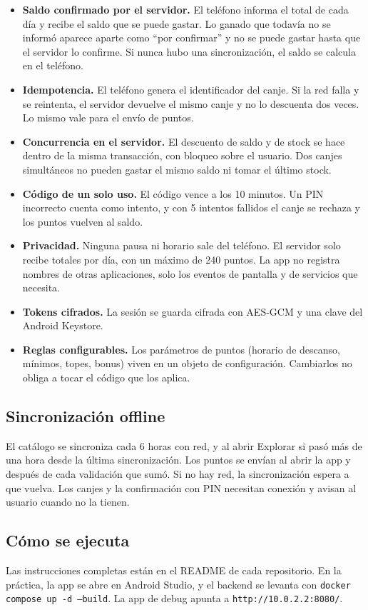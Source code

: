 \begin{itemize}
\item \textbf{Saldo confirmado por el servidor.} El teléfono informa el total de cada día y recibe el
saldo que se puede gastar. Lo ganado que todavía no se informó aparece aparte como ``por confirmar''
y no se puede gastar hasta que el servidor lo confirme. Si nunca hubo una sincronización, el saldo se
calcula en el teléfono.
\item \textbf{Idempotencia.} El teléfono genera el identificador del canje. Si la red falla y se reintenta,
el servidor devuelve el mismo canje y no lo descuenta dos veces. Lo mismo vale para el envío de puntos.
\item \textbf{Concurrencia en el servidor.} El descuento de saldo y de stock se hace dentro de la misma
transacción, con bloqueo sobre el usuario. Dos canjes simultáneos no pueden gastar el mismo saldo ni
tomar el último stock.
\item \textbf{Código de un solo uso.} El código vence a los 10 minutos. Un PIN incorrecto cuenta como
intento, y con 5 intentos fallidos el canje se rechaza y los puntos vuelven al saldo.
\item \textbf{Privacidad.} Ninguna pausa ni horario sale del teléfono. El servidor solo recibe totales
por día, con un máximo de 240 puntos. La app no registra nombres de otras aplicaciones, solo los
eventos de pantalla y de servicios que necesita.
\item \textbf{Tokens cifrados.} La sesión se guarda cifrada con AES-GCM y una clave del Android Keystore.
\item \textbf{Reglas configurables.} Los parámetros de puntos (horario de descanso, mínimos, topes,
bonus) viven en un objeto de configuración. Cambiarlos no obliga a tocar el código que los aplica.
\end{itemize}

\subsection{Sincronización offline}

El catálogo se sincroniza cada 6 horas con red, y al abrir Explorar si pasó más de una hora desde la
última sincronización. Los puntos se envían al abrir la app y después de cada validación que sumó. Si no
hay red, la sincronización espera a que vuelva. Los canjes y la confirmación con PIN necesitan conexión
y avisan al usuario cuando no la tienen.

\subsection{Cómo se ejecuta}

Las instrucciones completas están en el README de cada repositorio. En la práctica, la app se abre en
Android Studio, y el backend se levanta con \texttt{docker compose up -d --build}. La app de debug apunta
a \texttt{http://10.0.2.2:8080/}.
